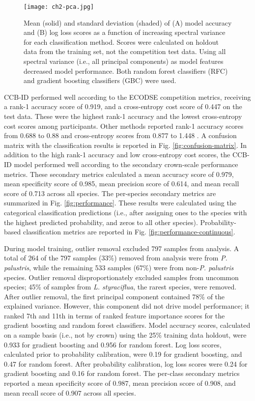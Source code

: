 \begin{figure}[!ht]
\texttt{[image: ch2-pca.jpg]}
\centering
\caption[Model accuracy and log loss scores changing as a function of the number in input principal components.]{Mean (solid) and standard deviation (shaded) of (A) model accuracy and (B) log loss scores as a function of increasing spectral variance for each classification method. Scores were calculated on holdout data from the training set, not the competition test data. Using all spectral variance (i.e., all principal components) as model features decreased model performance. Both random forest classifiers (RFC) and gradient boosting classifiers (GBC) were used.}
\label{fig:pca}
\end{figure}

CCB-ID performed well according to the ECODSE competition metrics, receiving a rank-1 accuracy score of 0.919, and a cross-entropy cost score of 0.447 on the test data. These were the highest rank-1 accuracy and the lowest cross-entropy cost scores among participants. Other methods reported rank-1 accuracy scores from 0.688 to 0.88 and cross-entropy scores from 0.877 to 1.448 \cite{Marconi2018-wn}. A confusion matrix with the classification results is reported in Fig. \ref{fig:confusion-matrix}. In addition to the high rank-1 accuracy and low cross-entropy cost scores, the CCB-ID model performed well according to the secondary crown-scale performance metrics. These secondary metrics calculated a mean accuracy score of 0.979, mean specificity score of 0.985, mean precision score of 0.614, and mean recall score of 0.713 across all species. The per-species secondary metrics are summarized in Fig. \ref{fig:performance}. These results were calculated using the categorical classification predictions (i.e., after assigning ones to the species with the highest predicted probability, and zeros to all other species). Probability-based classification metrics are reported in Fig. \ref{fig:performance-continuous}.

During model training, outlier removal excluded 797 samples from analysis. A total of 264 of the 797 samples (33\%) removed from analysis were from \textit{P. palustris}, while the remaining 533 samples (67\%) were from non-\textit{P. palustris} species. Outlier removal disproportionately excluded samples from uncommon species; 45\% of samples from \textit{L. styraciflua}, the rarest species, were removed. After outlier removal, the first principal component contained 78\% of the explained variance. However, this component did not drive model performance; it ranked 7th and 11th in terms of ranked feature importance scores for the gradient boosting and random forest classifiers. Model accuracy scores, calculated on a sample basis (i.e., not by crown) using the 25\% training data holdout, were 0.933 for gradient boosting and 0.956 for random forest. Log loss scores, calculated prior to probability calibration, were 0.19 for gradient boosting, and 0.47 for random forest. After probability calibration, log loss scores were 0.24 for gradient boosting and 0.16 for random forest. The per-class secondary metrics reported a mean specificity score of 0.987, mean precision score of 0.908, and mean recall score of 0.907 across all species.

